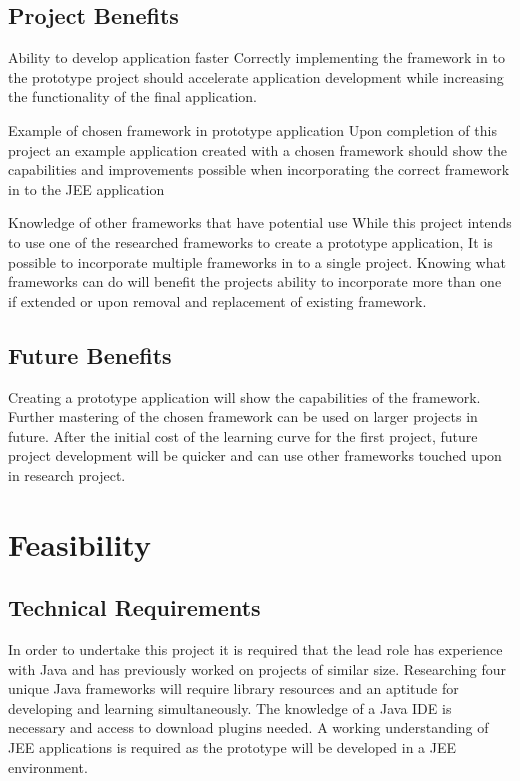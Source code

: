 \documentclass[]{report}
\begin{document}
	
	\subsection{Project Benefits}
	Ability to develop application faster\newline
	Correctly implementing the framework in to the prototype project should accelerate application development while increasing the functionality of the final application.
	
	Example of chosen framework in prototype application\newline
	Upon completion of this project an example application created with a chosen framework should show the capabilities and improvements possible when incorporating the correct framework in to the JEE application

	Knowledge of other frameworks that have potential use\newline
	While this project intends to use one of the researched frameworks to create a prototype application, It is possible to incorporate multiple frameworks in to a single project. Knowing what frameworks can do will benefit the projects ability to incorporate more than one if extended or upon removal and replacement of existing framework.
	
	\subsection{Future Benefits}
	Creating a prototype application will show the capabilities of the framework. Further mastering of the chosen framework can be used on larger projects in future. After the initial cost of the learning curve for the first project, future project development will be quicker and can use other frameworks touched upon in research project.

\section{Feasibility}
	\subsection{Technical Requirements}
	In order to undertake this project it is required that the lead role has experience with Java and has previously worked on projects of similar size. Researching four unique Java frameworks will require library resources and an aptitude for developing and learning simultaneously. The knowledge of a Java IDE is necessary and access to download plugins needed. A working understanding of JEE applications is required as the prototype will be developed in a JEE environment.  
		
\end{document}
